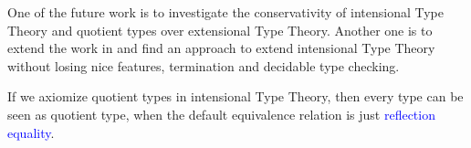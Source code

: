 \documentclass[envcountsame]{llncs}
\newcommand{\ed}[1]{\textcolor{blue}{#1}}
\newcommand{\itt}{intensional Type Theory}
\newcommand{\ett}{extensional Type Theory}
\begin{document}
One of the future work is to investigate the conservativity of \itt{}
and quotient types over \ett{}. Another one is to extend the work in
\cite{alt:99} and find an approach to extend \itt{} without losing
nice features, termination and decidable type checking. 

% 

If we axiomize quotient types in \itt, then every type can be seen as quotient type, when the default equivalence relation is just \ed{reflection equality}.
\newpage


\end{document}
